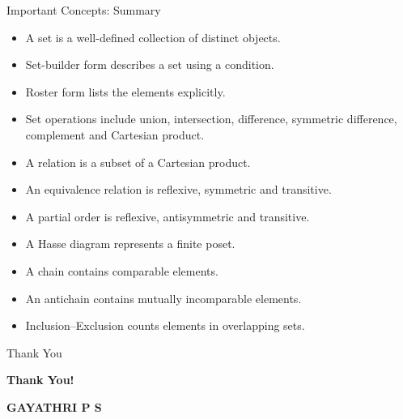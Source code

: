 \documentclass[aspectratio=169]{beamer}
\begin{document}
\begin{frame}{Important Concepts: Summary}
\begin{itemize}
\item A set is a well-defined collection of distinct objects.
\item Set-builder form describes a set using a condition.
\item Roster form lists the elements explicitly.
\item Set operations include union, intersection, difference, symmetric difference, complement and Cartesian product.
\item A relation is a subset of a Cartesian product.
\item An equivalence relation is reflexive, symmetric and transitive.
\item A partial order is reflexive, antisymmetric and transitive.
\item A Hasse diagram represents a finite poset.
\item A chain contains comparable elements.
\item An antichain contains mutually incomparable elements.
\item Inclusion--Exclusion counts elements in overlapping sets.
\end{itemize}
\end{frame}

\begin{frame}{Thank You}
\begin{center}
\Huge\textbf{Thank You!}

\vspace{1cm}




\textbf{GAYATHRI P S}
\end{center}
\end{frame}
\end{document}
